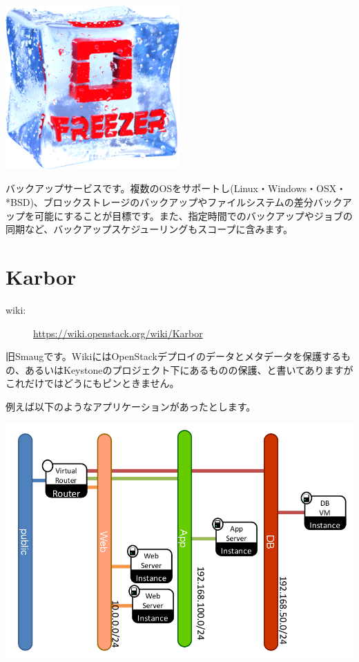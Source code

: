 \includegraphics[width=0.5\textwidth]{img/freezer_logo.png}

バックアップサービスです。複数のOSをサポートし(Linux・Windows・OSX・*BSD)、ブロックストレージのバックアップやファイルシステムの差分バックアップを可能にすることが目標です。また、指定時間でのバックアップやジョブの同期など、バックアップスケジューリングもスコープに含みます。

\section{Karbor}
\begin{description}
	\item[wiki:] \url{https://wiki.openstack.org/wiki/Karbor}
\end{description}
旧Smaugです。WikiにはOpenStackデプロイのデータとメタデータを保護するもの、あるいはKeystoneのプロジェクト下にあるものの保護、と書いてありますがこれだけではどうにもピンときません。

例えば以下のようなアプリケーションがあったとします。

\includegraphics[width=\textwidth]{img/Smaug-sample-application.png}

